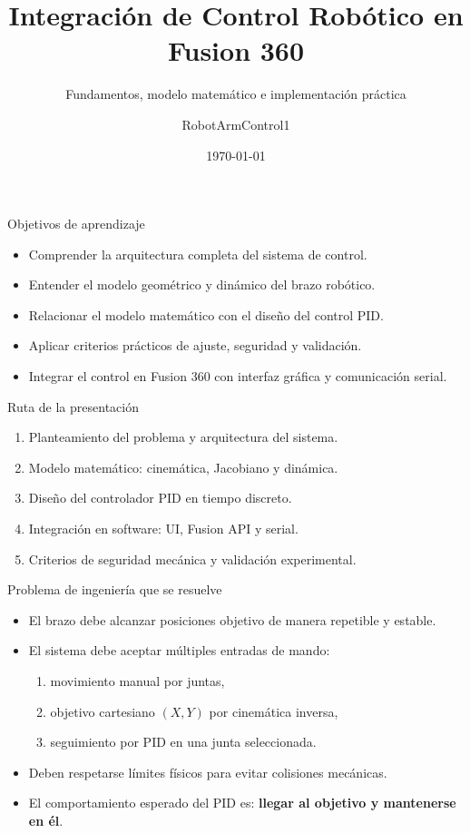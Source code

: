 \documentclass[aspectratio=169]{beamer}
\title{Integración de Control Robótico en Fusion 360}
\subtitle{Fundamentos, modelo matemático e implementación práctica}
\author{RobotArmControl1}
\date{\today}
\begin{document}
\begin{frame}
  \titlepage
\end{frame}

\begin{frame}{Objetivos de aprendizaje}
\begin{itemize}
  \item Comprender la arquitectura completa del sistema de control.
  \item Entender el modelo geométrico y dinámico del brazo robótico.
  \item Relacionar el modelo matemático con el diseño del control PID.
  \item Aplicar criterios prácticos de ajuste, seguridad y validación.
  \item Integrar el control en Fusion 360 con interfaz gráfica y comunicación serial.
\end{itemize}
\end{frame}

\begin{frame}{Ruta de la presentación}
\begin{enumerate}
  \item Planteamiento del problema y arquitectura del sistema.
  \item Modelo matemático: cinemática, Jacobiano y dinámica.
  \item Diseño del controlador PID en tiempo discreto.
  \item Integración en software: UI, Fusion API y serial.
  \item Criterios de seguridad mecánica y validación experimental.
\end{enumerate}
\end{frame}

\begin{frame}{Problema de ingeniería que se resuelve}
\begin{itemize}
  \item El brazo debe alcanzar posiciones objetivo de manera repetible y estable.
  \item El sistema debe aceptar múltiples entradas de mando:
  \begin{enumerate}
    \item movimiento manual por juntas,
    \item objetivo cartesiano $(X,Y)$ por cinemática inversa,
    \item seguimiento por PID en una junta seleccionada.
  \end{enumerate}
  \item Deben respetarse límites físicos para evitar colisiones mecánicas.
  \item El comportamiento esperado del PID es: \textbf{llegar al objetivo y mantenerse en él}.
\end{itemize}
\end{frame}
\end{document}

